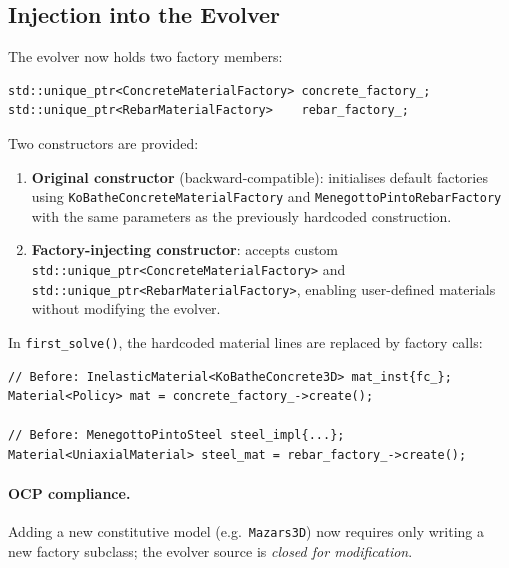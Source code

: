 \subsection{Injection into the Evolver}
\label{sec:refactor-factory-injection}

The evolver now holds two factory members:

\begin{lstlisting}[caption={Factory members in the evolver.}]
std::unique_ptr<ConcreteMaterialFactory> concrete_factory_;
std::unique_ptr<RebarMaterialFactory>    rebar_factory_;
\end{lstlisting}

Two constructors are provided:

\begin{enumerate}
  \item \textbf{Original constructor} (backward-compatible): initialises
    default factories using \texttt{KoBatheConcreteMaterialFactory}
    and \texttt{MenegottoPintoRebarFactory} with the same parameters
    as the previously hardcoded construction.
  \item \textbf{Factory-injecting constructor}: accepts custom
    \texttt{std::unique\_ptr<ConcreteMaterialFactory>} and
    \texttt{std::unique\_ptr<RebarMaterialFactory>}, enabling
    user-defined materials without modifying the evolver.
\end{enumerate}

In \texttt{first\_solve()}, the hardcoded material lines are replaced
by factory calls:

\begin{lstlisting}[caption={Factory-delegated material creation.}]
// Before: InelasticMaterial<KoBatheConcrete3D> mat_inst{fc_};
Material<Policy> mat = concrete_factory_->create();

// Before: MenegottoPintoSteel steel_impl{...};
Material<UniaxialMaterial> steel_mat = rebar_factory_->create();
\end{lstlisting}

\paragraph{OCP compliance.}
Adding a new constitutive model (e.g.\ \texttt{Mazars3D}) now
requires only writing a new factory subclass; the evolver source is
\emph{closed for modification}.


